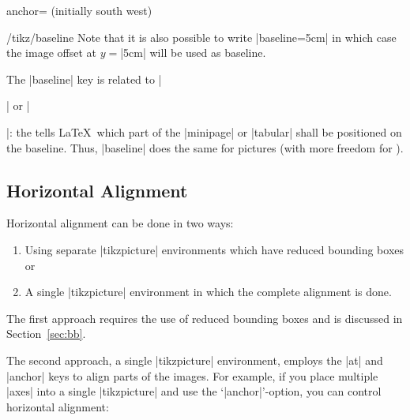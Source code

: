 \begin{pgfplotskey}{anchor= (initially south west)}
\begin{key}{/tikz/baseline}
	Note that it is also possible to write |baseline=5cm| in which case the image offset at $y=$|5cm| will be used as baseline.
\end{key}
The |baseline| key is related to |\begin{minipage}| or |\begin{tabular}|: the  tells \LaTeX\ which part of the |minipage| or |tabular| shall be positioned on the baseline. Thus, |baseline| does the same for pictures (with more freedom for ).

\subsection{Horizontal Alignment}
\label{sec:halign}%
Horizontal alignment can be done in two ways:
\begin{enumerate}
	\item Using separate |tikzpicture| environments which have reduced bounding boxes or
	\item A single |tikzpicture| environment in which the complete alignment is done.
\end{enumerate}
The first approach requires the use of reduced bounding boxes and is discussed in Section~\ref{sec:bb}.

The second approach, a single |tikzpicture| environment, employs the |at| and |anchor| keys to align parts of the images. For example, if you place multiple |axes| into a single |tikzpicture| and use the `|anchor|'-option, you can control horizontal alignment:
\begin{codeexample}[]
\end{codeexample}
\end{tabular}
\end{minipage}
\end{pgfplotskey}
